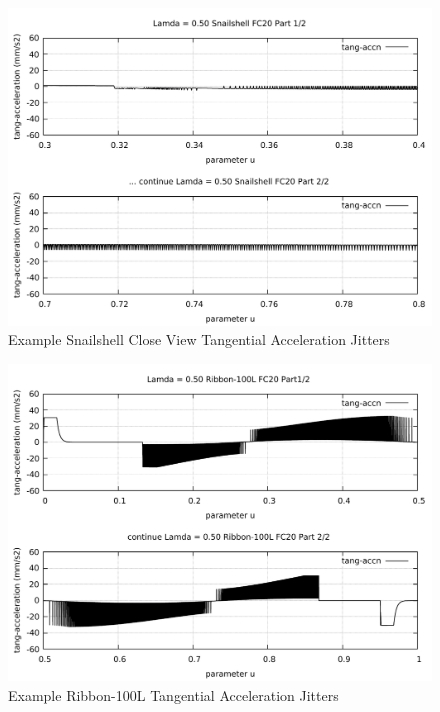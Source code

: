 \clearpage
\pagebreak
\begin{landscape}
	\begin{figure}
		\centering
		\caption  {Example Snailshell Close View Tangential Acceleration Jitters}
		\label{img-Example Snailshell Close View Tangential Acceleration Jitters}
		\includegraphics[width=1.30\textwidth]{Chap4/Lamda/jitters/Example-Snailshell-Jitters-Lamda-050-FC20-Part-2-of-2.pdf} 
	\end{figure}
\end{landscape}

\clearpage
\pagebreak
\begin{landscape}
	\begin{figure}
		\centering
		\caption  {Example Ribbon-100L Tangential Acceleration Jitters}
		\label{img-Example Ribbon-100L Tangential Acceleration Jitters}
		\includegraphics[width=1.30\textwidth]{Chap4/Lamda/jitters/Example-Ribbon-100L-Jitters-Lamda-050-FC20-Part-1-of-2.pdf} 
	\end{figure}
\end{landscape}

